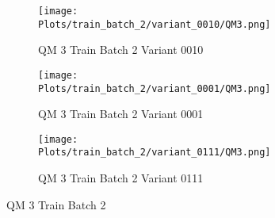 \documentclass{DissertateFigs}
\begin{document}
\begin{figure}[t!]
\medskip

    \begin{subfigure}{0.47\textwidth}
    \texttt{[image: Plots/train\_batch\_2/variant\_0010/QM3.png]}
    \caption{QM 3 Train Batch 2 Variant 0010}
    \end{subfigure}
    \begin{subfigure}{0.47\textwidth}
    \texttt{[image: Plots/train\_batch\_2/variant\_0001/QM3.png]}
    \caption{QM 3 Train Batch 2 Variant 0001}
    \end{subfigure}

\medskip

    \begin{subfigure}{0.47\textwidth}
    \texttt{[image: Plots/train\_batch\_2/variant\_0111/QM3.png]}
    \caption{QM 3 Train Batch 2 Variant 0111}
    \end{subfigure}
\caption{QM 3 Train Batch 2}
    \end{figure}
\clearpage
\end{document}
